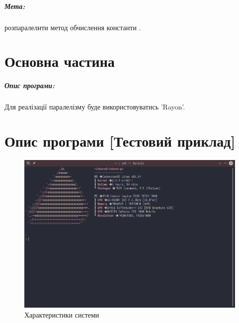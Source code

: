 \documentclass{udstu}
\begin{document}

\tableofcontents

\intro

\paragraph{\textbf{Мета:}} розпаралелити метод обчислення константи \pi.


\chapter{Основна частина}
\label{chap:1}

\paragraph{\textbf{Опис програми:}}

Для реалізації паралелізму буде використовуватись 'Rayon'.

\chapter{Опис програми [Тестовий приклад]}
\label{chap:3}

\begin{figure}[!htp]
	\centering
	\includegraphics[scale=0.5]{PNG/system-specs.png}
	\caption{Характеристики системи}
	\label{fig:figure1}
\end{figure}
\end{document}
